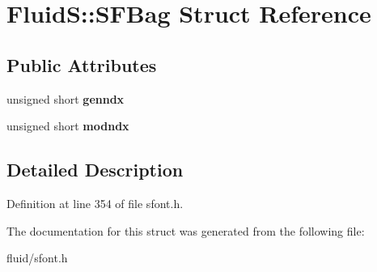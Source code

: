 \hypertarget{struct_fluid_s_1_1_s_f_bag}{}\section{FluidS\+:\+:S\+F\+Bag Struct Reference}
\label{struct_fluid_s_1_1_s_f_bag}
\subsection*{Public Attributes}
\begin{DoxyCompactItemize}
\item 
\mbox{\label{struct_fluid_s_1_1_s_f_bag_a3bde27cff6e64a513345a00c2a6e1721}} 
unsigned short {\bfseries genndx}
\item 
\mbox{\label{struct_fluid_s_1_1_s_f_bag_a9522327ab7572223c98d50335f1c0564}} 
unsigned short {\bfseries modndx}
\end{DoxyCompactItemize}


\subsection{Detailed Description}


Definition at line 354 of file sfont.\+h.



The documentation for this struct was generated from the following file\+:\begin{DoxyCompactItemize}
\item 
fluid/sfont.\+h\end{DoxyCompactItemize}
